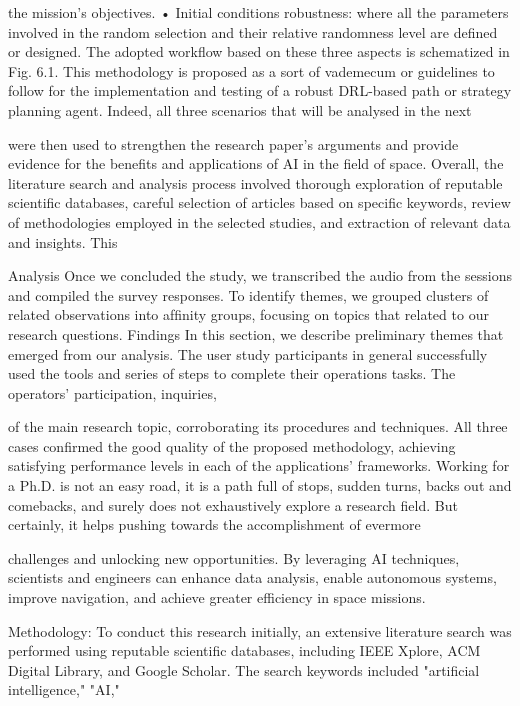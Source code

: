 \documentclass[a4paper,12pt]{article}
\begin{document}
the mission’s objectives.
• Initial conditions robustness: where all the parameters involved in
the random selection and their relative randomness level are defined or
designed.
The adopted workflow based on these three aspects is schematized in Fig. 6.1.
This methodology is proposed as a sort of vademecum or guidelines to follow
for the implementation and testing of a robust DRL-based path or strategy
planning agent. Indeed, all three scenarios that will be analysed in the next

were then used to strengthen the research paper's 
arguments and provide evidence for the benefits and 
applications of AI in the field of space. 
Overall, the literature search and analysis process 
involved 
thorough 
exploration 
of 
reputable 
scientific databases, careful selection of articles 
based 
on 
specific 
keywords, 
review 
of 
methodologies employed in the selected studies, and 
extraction of relevant data and insights. This

Analysis
Once we concluded the study, we transcribed the audio from
the sessions and compiled the survey responses. To identify
themes, we grouped clusters of related observations into
afﬁnity groups, focusing on topics that related to our research
questions.
Findings
In this section, we describe preliminary themes that emerged
from our analysis.
The user study participants in general
successfully used the tools and series of steps to complete
their operations tasks. The operators’ participation, inquiries,

of the main research topic, corroborating its procedures and techniques. All
three cases confirmed the good quality of the proposed methodology, achieving
satisfying performance levels in each of the applications’ frameworks.
Working for a Ph.D. is not an easy road, it is a path full of stops, sudden turns,
backs out and comebacks, and surely does not exhaustively explore a research
field. But certainly, it helps pushing towards the accomplishment of evermore

challenges and unlocking new opportunities. By 
leveraging AI techniques, scientists and engineers 
can enhance data analysis, enable autonomous 
systems, improve navigation, and achieve greater 
efficiency in space missions. 
 
Methodology: 
To conduct this research initially, an extensive 
literature search was performed using reputable 
scientific databases, including IEEE Xplore, ACM 
Digital Library, and Google Scholar. The search 
keywords included "artificial intelligence," "AI,"
\end{document}
